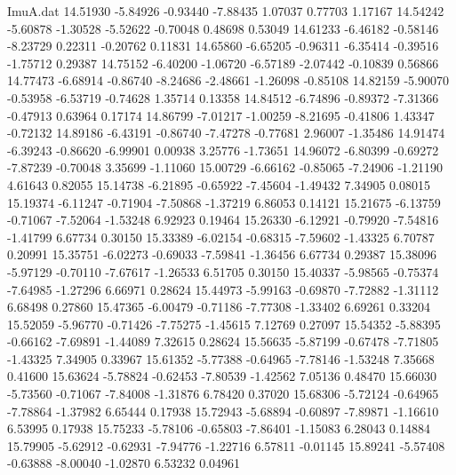 \begin{filecontents}{ImuA.dat}
  14.51930   -5.84926   -0.93440   -7.88435    1.07037    0.77703    1.17167
  14.54242   -5.60878   -1.30528   -5.52622   -0.70048    0.48698    0.53049
  14.61233   -6.46182   -0.58146   -8.23729    0.22311   -0.20762    0.11831
  14.65860   -6.65205   -0.96311   -6.35414   -0.39516   -1.75712    0.29387
  14.75152   -6.40200   -1.06720   -6.57189   -2.07442   -0.10839    0.56866
  14.77473   -6.68914   -0.86740   -8.24686   -2.48661   -1.26098   -0.85108
  14.82159   -5.90070   -0.53958   -6.53719   -0.74628    1.35714    0.13358
  14.84512   -6.74896   -0.89372   -7.31366   -0.47913    0.63964    0.17174
  14.86799   -7.01217   -1.00259   -8.21695   -0.41806    1.43347   -0.72132
  14.89186   -6.43191   -0.86740   -7.47278   -0.77681    2.96007   -1.35486
  14.91474   -6.39243   -0.86620   -6.99901    0.00938    3.25776   -1.73651
  14.96072   -6.80399   -0.69272   -7.87239   -0.70048    3.35699   -1.11060
  15.00729   -6.66162   -0.85065   -7.24906   -1.21190    4.61643    0.82055
  15.14738   -6.21895   -0.65922   -7.45604   -1.49432    7.34905    0.08015
  15.19374   -6.11247   -0.71904   -7.50868   -1.37219    6.86053    0.14121
  15.21675   -6.13759   -0.71067   -7.52064   -1.53248    6.92923    0.19464
  15.26330   -6.12921   -0.79920   -7.54816   -1.41799    6.67734    0.30150
  15.33389   -6.02154   -0.68315   -7.59602   -1.43325    6.70787    0.20991
  15.35751   -6.02273   -0.69033   -7.59841   -1.36456    6.67734    0.29387
  15.38096   -5.97129   -0.70110   -7.67617   -1.26533    6.51705    0.30150
  15.40337   -5.98565   -0.75374   -7.64985   -1.27296    6.66971    0.28624
  15.44973   -5.99163   -0.69870   -7.72882   -1.31112    6.68498    0.27860
  15.47365   -6.00479   -0.71186   -7.77308   -1.33402    6.69261    0.33204
  15.52059   -5.96770   -0.71426   -7.75275   -1.45615    7.12769    0.27097
  15.54352   -5.88395   -0.66162   -7.69891   -1.44089    7.32615    0.28624
  15.56635   -5.87199   -0.67478   -7.71805   -1.43325    7.34905    0.33967
  15.61352   -5.77388   -0.64965   -7.78146   -1.53248    7.35668    0.41600
  15.63624   -5.78824   -0.62453   -7.80539   -1.42562    7.05136    0.48470
  15.66030   -5.73560   -0.71067   -7.84008   -1.31876    6.78420    0.37020
  15.68306   -5.72124   -0.64965   -7.78864   -1.37982    6.65444    0.17938
  15.72943   -5.68894   -0.60897   -7.89871   -1.16610    6.53995    0.17938
  15.75233   -5.78106   -0.65803   -7.86401   -1.15083    6.28043    0.14884
  15.79905   -5.62912   -0.62931   -7.94776   -1.22716    6.57811   -0.01145
  15.89241   -5.57408   -0.63888   -8.00040   -1.02870    6.53232    0.04961

\end{filecontents}
